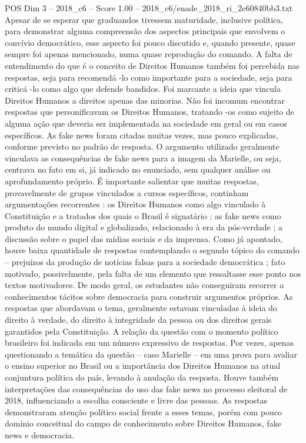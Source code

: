 \begin{textsample}{POS Dim 3 – 2018\_c6 – Score 1.00 – 2018\_c6/enade\_2018\_ri\_2e60840bb3.txt}
Apesar de se esperar que graduandos tivessem maturidade, inclusive política, para demonstrar alguma compreensão dos aspectos principais que envolvem o convívio democrático, esse aspecto foi pouco discutido e, quando presente, quase sempre foi apenas mencionado, numa quase reprodução do comando.
A falta de entendimento do que é o conceito de Direitos Humanos também foi percebida nas respostas, seja para recomendá -lo como importante para a sociedade, seja para criticá -lo como algo que defende bandidos.
Foi marcante a ideia que vincula Direitos Humanos a direitos apenas das minorias.
Não foi incomum encontrar respostas que personificavam os Direitos Humanos, tratando -os como sujeito de alguma ação que deveria ser implementada na sociedade em geral ou em casos específicos.
As fake news foram citadas muitas vezes, mas pouco explicadas, conforme previsto no padrão de resposta.
O argumento utilizado geralmente vinculava as consequências de fake news para a imagem da Marielle, ou seja, centrava no fato em si, já indicado no enunciado, sem qualquer análise ou aprofundamento próprio.
É importante salientar que muitas respostas, provavelmente de grupos vinculados a cursos específicos, continham argumentações recorrentes : os Direitos Humanos como algo vinculado à Constituição e a tratados dos quais o Brasil é signatário ; as fake news como produto do mundo digital e globalizado, relacionado à era da pós-verdade ; a discussão sobre o papel das mídias sociais e da imprensa.
Como já apontado, houve baixa quantidade de respostas contemplando o segundo tópico do comando – prejuízos da produção de notícias falsas para a sociedade democrática ; fato motivado, possivelmente, pela falta de um elemento que ressaltasse esse ponto nos textos motivadores.
De modo geral, os estudantes não conseguiram recorrer a conhecimentos tácitos sobre democracia para construir argumentos próprios.
As respostas que abordavam o tema, geralmente estavam vinculadas à ideia do direito à verdade, do direito à integridade da pessoa ou dos direitos gerais garantidos pela Constituição.
A relação da questão com o momento político brasileiro foi indicada em um número expressivo de respostas.
Por vezes, apenas questionando a temática da questão – caso Marielle – em uma prova para avaliar o ensino superior no Brasil ou a importância dos Direitos Humanos na atual conjuntura política do país, levando à anulação da resposta.
Houve também interpretações das consequências do uso das fake news no processo eleitoral de 2018, influenciando a escolha consciente e livre das pessoas.
As respostas demonstraram atenção político social frente a esses temas, porém com pouco domínio conceitual do campo de conhecimento sobre Direitos Humanos, fake news e democracia.

\end{textsample}
